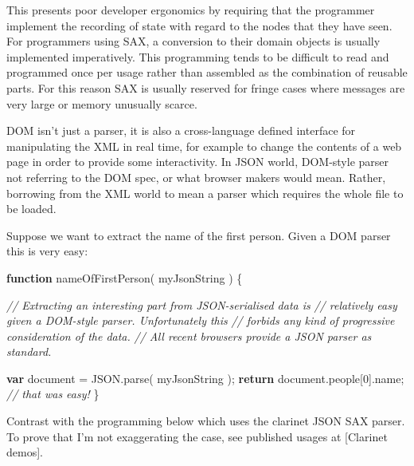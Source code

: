 \documentclass[]{article}
\newenvironment{Shaded}{}{}
\newcommand{\KeywordTok}[1]{\textcolor[rgb]{0.00,0.44,0.13}{\textbf{{#1}}}}
\newcommand{\DecValTok}[1]{\textcolor[rgb]{0.25,0.63,0.44}{{#1}}}
\newcommand{\CommentTok}[1]{\textcolor[rgb]{0.38,0.63,0.69}{\textit{{#1}}}}
\newcommand{\OtherTok}[1]{\textcolor[rgb]{0.00,0.44,0.13}{{#1}}}
\newcommand{\FunctionTok}[1]{\textcolor[rgb]{0.02,0.16,0.49}{{#1}}}
\newcommand{\NormalTok}[1]{{#1}}
\begin{document}
This presents poor developer ergonomics by requiring that the programmer
implement the recording of state with regard to the nodes that they have
seen. For programmers using SAX, a conversion to their domain objects is
usually implemented imperatively. This programming tends to be difficult
to read and programmed once per usage rather than assembled as the
combination of reusable parts. For this reason SAX is usually reserved
for fringe cases where messages are very large or memory unusually
scarce.

DOM isn't just a parser, it is also a cross-language defined interface
for manipulating the XML in real time, for example to change the
contents of a web page in order to provide some interactivity. In JSON
world, DOM-style parser not referring to the DOM spec, or what browser
makers would mean. Rather, borrowing from the XML world to mean a parser
which requires the whole file to be loaded.

Suppose we want to extract the name of the first person. Given a DOM
parser this is very easy:

\begin{Shaded}
\begin{Highlighting}[]
\KeywordTok{function} \FunctionTok{nameOfFirstPerson}\NormalTok{( myJsonString ) \{}

   \CommentTok{// Extracting an interesting part from JSON-serialised data is}
   \CommentTok{// relatively easy given a DOM-style parser. Unfortunately this}
   \CommentTok{// forbids any kind of progressive consideration of the data.}
   \CommentTok{// All recent browsers provide a JSON parser as standard. }

   \KeywordTok{var} \NormalTok{document = }\OtherTok{JSON}\NormalTok{.}\FunctionTok{parse}\NormalTok{( myJsonString );}
   \KeywordTok{return} \OtherTok{document}\NormalTok{.}\FunctionTok{people}\NormalTok{[}\DecValTok{0}\NormalTok{].}\FunctionTok{name}\NormalTok{; }\CommentTok{// that was easy!}
\NormalTok{\}}
\end{Highlighting}
\end{Shaded}

Contrast with the programming below which uses the clarinet JSON SAX
parser. To prove that I'm not exaggerating the case, see published
usages at {[}Clarinet demos{]}.

\pagebreak
\end{document}
